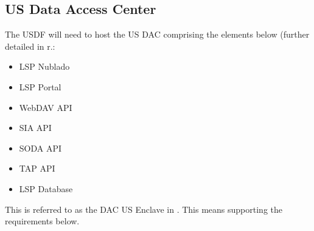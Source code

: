 \subsection{US Data Access Center}
The USDF will need to host the US \gls{DAC} comprising the elements below (further detailed in r.:
\begin{itemize}
\item LSP Nublado
\item LSP Portal
\item WebDAV API
\item \gls{SIA} API
\item \gls{SODA} API
\item \gls{TAP} API
\item LSP Database
\end{itemize}
This is referred to as the \gls{DAC} US Enclave in .
This means supporting the \DMSR requirements below.


